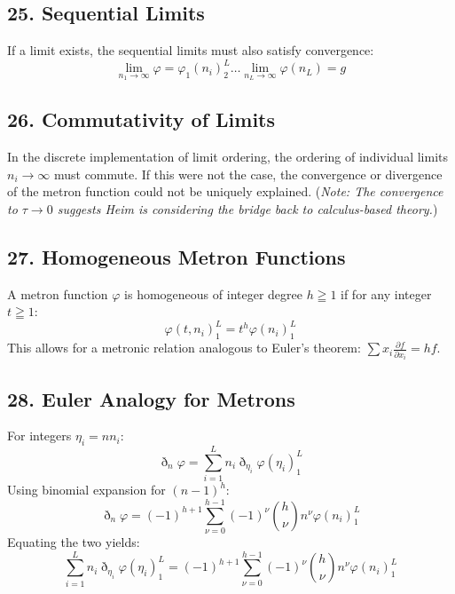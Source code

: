 \documentclass[11pt,a4paper,oneside]{article}
\begin{document}
\subsection{25. Sequential Limits}
If a limit exists, the sequential limits must also satisfy convergence:
\begin{equation*}
    \lim_{n_1 \to \infty} \varphi = \varphi_1(n_i)_2^L \dots \lim_{n_L \to \infty} \varphi(n_L) = g
\end{equation*}

\subsection{26. Commutativity of Limits}
In the discrete implementation of limit ordering, the ordering of individual limits $n_i \to \infty$ must commute. If this were not the case, the convergence or divergence of the metron function could not be uniquely explained.
(\textit{Note: The convergence to $\tau \to 0$ suggests Heim is considering the bridge back to calculus-based theory.})

\subsection{27. Homogeneous Metron Functions}
A metron function $\varphi$ is homogeneous of integer degree $h \geqq 1$ if for any integer $t \geqq 1$:
\begin{equation*}
    \varphi(t, n_i)_1^L = t^h \varphi(n_i)_1^L
\end{equation*}
This allows for a metronic relation analogous to Euler's theorem: $\sum x_i \frac{\partial f}{\partial x_i} = hf$.

\subsection{28. Euler Analogy for Metrons}
For integers $\eta_i = n n_i$:
\begin{equation*}
    \eth_n \varphi = \sum_{i=1}^L n_i \eth_{\eta_i} \varphi(\eta_i)_1^L
\end{equation*}
Using binomial expansion for $(n-1)^h$:
\begin{equation*}
    \eth_n \varphi = (-1)^{h+1} \sum_{\nu=0}^{h-1} (-1)^\nu \binom{h}{\nu} n^\nu \varphi(n_i)_1^L
\end{equation*}
Equating the two yields:
\begin{equation*}
    \sum_{i=1}^L n_i \eth_{\eta_i} \varphi(\eta_i)_1^L = (-1)^{h+1} \sum_{\nu=0}^{h-1} (-1)^\nu \binom{h}{\nu} n^\nu \varphi(n_i)_1^L
\end{equation*}
\end{document}
